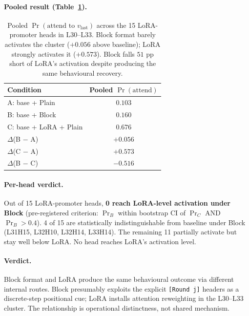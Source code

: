 \documentclass[11pt]{article}
\begin{document}
\paragraph{Pooled result (Table~\ref{tab:block_locus_pooled}).}
\begin{table}[!htbp]
\centering
\footnotesize
\setlength{\tabcolsep}{4pt}
\begin{tabular}{lc}
\toprule
\textbf{Condition} & \textbf{Pooled $\Pr(\text{attend})$} \\
\midrule
A: base + Plain        & $0.103$ \\
B: base + Block        & $0.160$ \\
C: base + LoRA + Plain & $0.676$ \\
\midrule
$\Delta$(B $-$ A)      & $+0.056$ \\
$\Delta$(C $-$ A)      & $+0.573$ \\
$\Delta$(B $-$ C)      & $-0.516$ \\
\bottomrule
\end{tabular}
\caption{Pooled $\Pr(\text{attend to }v_{\mathrm{last}})$ across
the 15 LoRA-promoter heads in L30--L33. Block format barely
activates the cluster ($+0.056$ above baseline); LoRA strongly
activates it ($+0.573$). Block falls $51$ pp short of LoRA's
activation despite producing the same behavioural recovery.}
\label{tab:block_locus_pooled}
\end{table}

\paragraph{Per-head verdict.}
Out of 15 LoRA-promoter heads, \textbf{0 reach LoRA-level
activation under Block} (pre-registered criterion:
$\Pr_B$ within bootstrap CI of $\Pr_C$ AND $\Pr_B > 0.4$). 4 of 15
are statistically indistinguishable from baseline under Block
(L31H15, L32H10, L32H14, L33H14). The remaining 11 partially
activate but stay well below LoRA. No head reaches LoRA's
activation level.

\paragraph{Verdict.} Block format and LoRA produce the same
behavioural outcome via different internal routes. Block presumably
exploits the explicit \texttt{[Round j]} headers as a discrete-step
positional cue; LoRA installs attention reweighting in the
L30--L33 cluster. The relationship is operational distinctness,
not shared mechanism.
\end{document}
